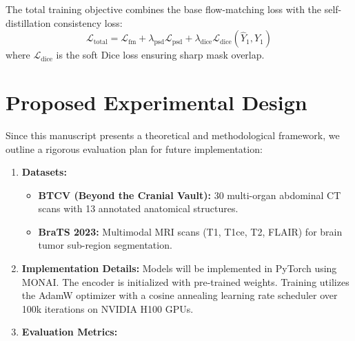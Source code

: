 \documentclass[10.1005,journal]{IEEEtran}
\begin{document}
The total training objective combines the base flow-matching loss with the self-distillation consistency loss:
$$\mathcal{L}_{\text{total}} = \mathcal{L}_{\text{fm}} + \lambda_{\text{psd}} \mathcal{L}_{\text{psd}} + \lambda_{\text{dice}} \mathcal{L}_{\text{dice}}(\hat{Y}_1, Y_1)$$
where $\mathcal{L}_{\text{dice}}$ is the soft Dice loss ensuring sharp mask overlap.

\section{Proposed Experimental Design}
Since this manuscript presents a theoretical and methodological framework, we outline a rigorous evaluation plan for future implementation:

\begin{enumerate}
    \item \textbf{Datasets:} 
    \begin{itemize}
        \item \textbf{BTCV (Beyond the Cranial Vault):} 30 multi-organ abdominal CT scans with 13 annotated anatomical structures.
        \item \textbf{BraTS 2023:} Multimodal MRI scans (T1, T1ce, T2, FLAIR) for brain tumor sub-region segmentation.
    \end{itemize}
    \item \textbf{Implementation Details:} Models will be implemented in PyTorch using MONAI. The encoder is initialized with pre-trained weights. Training utilizes the AdamW optimizer with a cosine annealing learning rate scheduler over 100k iterations on NVIDIA H100 GPUs.
    \item \textbf{Evaluation Metrics:}
\end{enumerate}
\end{document}
